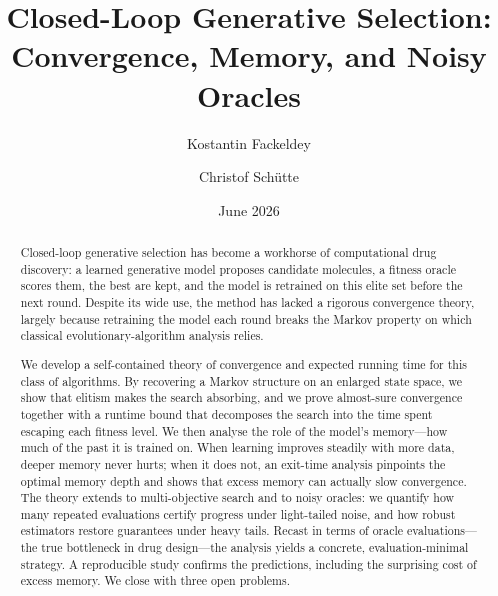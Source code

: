 \documentclass[11pt,a4paper]{article}
\begin{document}
\title{\bfseries
  Closed-Loop Generative Selection:\\[4pt]
  Convergence, Memory, and Noisy Oracles}

\author[1,3]{Kostantin Fackeldey}
\author[1,2]{Christof Sch\"utte}
\date{June 2026}
\maketitle


   \begin{abstract}
   Closed-loop generative selection has become a workhorse of computational
   drug discovery: a learned generative model proposes candidate molecules, a
   fitness oracle scores them, the best are kept, and the model is retrained on
   this elite set before the next round.  Despite its wide use, the method has
   lacked a rigorous convergence theory, largely because retraining the model
   each round breaks the Markov property on which classical
   evolutionary-algorithm analysis relies.

   We develop a self-contained theory of convergence and expected running time
   for this class of algorithms.  By recovering a Markov structure on an
   enlarged state space, we show that elitism makes the search absorbing, and
   we prove almost-sure convergence together with a runtime bound that
   decomposes the search into the time spent escaping each fitness level.  We
   then analyse the role of the model's memory---how much of the past it is
   trained on.  When learning improves steadily with more data, deeper memory
   never hurts; when it does not, an exit-time analysis pinpoints the optimal
   memory depth and shows that excess memory can actually slow convergence.
   The theory extends to multi-objective search and to noisy oracles: we
   quantify how many repeated evaluations certify progress under light-tailed
   noise, and how robust estimators restore guarantees under heavy tails.
   Recast in terms of oracle evaluations---the true bottleneck in drug
   design---the analysis yields a concrete, evaluation-minimal strategy.  A
   reproducible study confirms the predictions, including the surprising cost
   of excess memory.  We close with three open problems. 
   \end{abstract}
 
\end{document}
